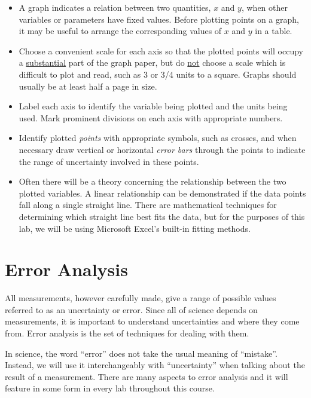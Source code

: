 \begin{itemize}
    \item A graph indicates a relation between two quantities, $x$ and $y$, when other variables or parameters have fixed values.  Before plotting points on a graph, it may be useful to arrange the corresponding values of $x$ and $y$ in a table.

    \item Choose a convenient scale for each axis so that the plotted points will occupy a \underline{substantial} part of the graph paper, but do \underline{not} choose a scale which is difficult to plot and read, such as 3 or 3/4 units to a square.  Graphs should usually be at least half a page in size.

    \item Label each axis to identify the variable being plotted and the units being used.  Mark prominent divisions on each axis with appropriate numbers.

    \item Identify plotted \emph{points} with appropriate symbols, such as crosses, and when necessary draw vertical or horizontal \emph{error bars} through the points to indicate the range of uncertainty involved in these points.

    \item Often there will be a theory concerning the relationship between the two plotted variables.  A linear relationship can be demonstrated if the data points fall along a single straight line.  There are mathematical techniques for determining which straight line best fits the data, but for the purposes of this lab, we will be using Microsoft Excel's built-in fitting methods.
\end{itemize}

\section{Error Analysis}

All measurements, however carefully made, give a range of possible values referred to as an uncertainty or error. Since all of science depends on measurements, it is important to understand uncertainties and where they come from. Error analysis is the set of techniques for dealing with them.\myskip

In science, the word ``error'' does not take the usual meaning of ``mistake''. Instead, we will use it interchangeably with ``uncertainty'' when talking about the result of a measurement. There are many aspects to error analysis and it will feature in some form in every lab throughout this course. \myskip

